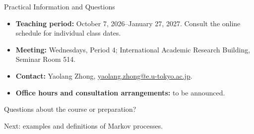 \begin{frame}{Practical Information and Questions}
\begin{itemize}
\item \textbf{Teaching period:} October 7, 2026--January 27, 2027. Consult the online schedule for individual class dates.
\item \textbf{Meeting:} Wednesdays, Period 4; International Academic Research Building, Seminar Room 514.
\item \textbf{Contact:} Yaolang Zhong, \href{mailto:yaolang.zhong@e.u-tokyo.ac.jp}{yaolang.zhong@e.u-tokyo.ac.jp}.
\item \textbf{Office hours and consultation arrangements:} to be announced.
\end{itemize}
\medskip
Questions about the course or preparation?\par
Next: examples and definitions of Markov processes.
\end{frame}

